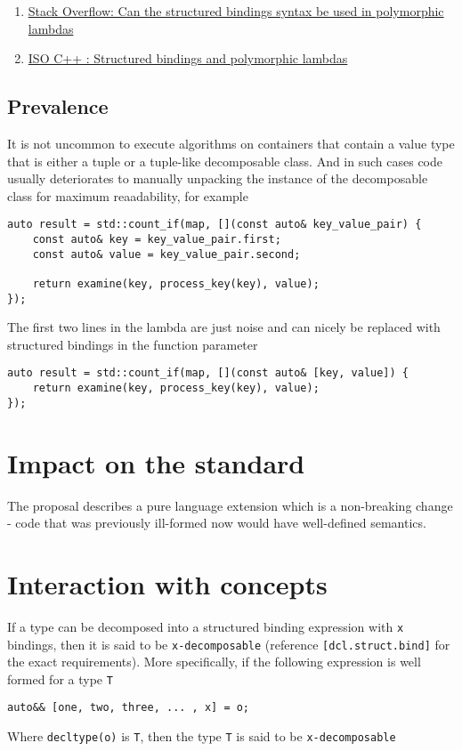 \documentclass{article}
\begin{document}
\begin{enumerate}
    \item \href{https://stackoverflow.com/questions/45541334}{Stack Overflow:
        Can the structured bindings syntax be used in polymorphic lambdas}
    \item \href{https://goo.gl/fRSwNg}{ISO C++ : Structured bindings and
        polymorphic lambdas}
\end{enumerate}

\subsection{Prevalence}
It is not uncommon to execute algorithms on containers that contain a value
type that is either a tuple or a tuple-like decomposable class.  And in such
cases code usually deteriorates to manually unpacking the instance of the
decomposable class for maximum reaadability, for example

\begin{lstlisting}
auto result = std::count_if(map, [](const auto& key_value_pair) {
    const auto& key = key_value_pair.first;
    const auto& value = key_value_pair.second;

    return examine(key, process_key(key), value);
});
\end{lstlisting}

The first two lines in the lambda are just noise and can nicely be replaced
with structured bindings in the function parameter

\begin{lstlisting}
auto result = std::count_if(map, [](const auto& [key, value]) {
    return examine(key, process_key(key), value);
});
\end{lstlisting}


\section{Impact on the standard}
The proposal describes a pure language extension which is a non-breaking
change - code that was previously ill-formed now would have well-defined
semantics.


\section{Interaction with concepts}
If a type can be decomposed into a structured binding expression with
\texttt{x} bindings, then it is said to be \texttt{x-decomposable} (reference
\texttt{[dcl.struct.bind]} for the exact requirements).  More specifically, if
the following expression is well formed for a type \texttt{T}
\begin{lstlisting}
auto&& [one, two, three, ... , x] = o;
\end{lstlisting}
Where \texttt{decltype(o)} is \texttt{T}, then the type \texttt{T} is said to
be \texttt{x-decomposable}
\end{document}
